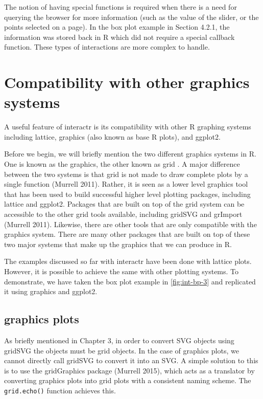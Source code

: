 \documentclass[11pt,]{report}
\begin{document}
The notion of having special functions is required when there is a need
for querying the browser for more information (such as the value of the
slider, or the points selected on a page). In the box plot example in
Section 4.2.1, the information was stored back in R which did not
require a special callback function. These types of interactions are
more complex to handle.

\section{Compatibility with other graphics
systems}\label{compatibility-with-other-graphics-systems}

A useful feature of interactr is its compatibility with other R graphing
systems including \textsf{lattice}, \textsf{graphics} (also known as
base R plots), and \textsf{ggplot2}.

Before we begin, we will briefly mention the two different graphics
systems in R. One is known as the \textsf{graphics}, the other known as
\textsf{grid} . A major difference between the two systems is that
\textsf{grid} is not made to draw complete plots by a single function
(Murrell 2011). Rather, it is seen as a lower level graphics tool that
has been used to build successful higher level plotting packages,
including lattice and ggplot2. Packages that are built on top of the
\textsf{grid} system can be accessible to the other \textsf{grid} tools
available, including \textsf{gridSVG} and \textsf{grImport} (Murrell
2011). Likewise, there are other tools that are only compatible with the
\textsf{graphics} system. There are many other packages that are built
on top of these two major systems that make up the graphics that we can
produce in R.

The examples discussed so far with \textsf{interactr} have been done
with \textsf{lattice} plots. However, it is possible to achieve the same
with other plotting systems. To demonstrate, we have taken the box plot
example in \autoref{fig:int-bp-3} and replicated it using
\textsf{graphics} and \textsf{ggplot2}.

\subsection{graphics plots}\label{graphics-plots}

As briefly mentioned in Chapter 3, in order to convert SVG objects using
gridSVG the objects must be grid objects. In the case of graphics plots,
we cannot directly call gridSVG to convert it into an SVG. A simple
solution to this is to use the \textsf{gridGraphics} package (Murrell
2015), which acts as a translator by converting graphics plots into grid
plots with a consistent naming scheme. The \texttt{grid.echo()} function
achieves this.
\end{document}
